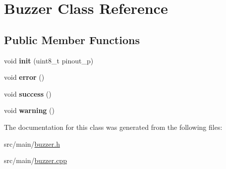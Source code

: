 \hypertarget{class_buzzer}{}\section{Buzzer Class Reference}
\label{class_buzzer}
\subsection*{Public Member Functions}
\begin{DoxyCompactItemize}
\item 
\mbox{\label{class_buzzer_ae5530b62a199e66e1c4c95dfd14bab3b}} 
void {\bfseries init} (uint8\+\_\+t pinout\+\_\+p)
\item 
\mbox{\label{class_buzzer_a84c33234bf71806d631e1a939d649438}} 
void {\bfseries error} ()
\item 
\mbox{\label{class_buzzer_a9d9c6ae9bd4993d9b34a96c5ae60b5ed}} 
void {\bfseries success} ()
\item 
\mbox{\label{class_buzzer_a90e969d3ca0c6300d7639bf650cf0f79}} 
void {\bfseries warning} ()
\end{DoxyCompactItemize}


The documentation for this class was generated from the following files\+:\begin{DoxyCompactItemize}
\item 
src/main/\hyperlink{buzzer_8h}{buzzer.\+h}\item 
src/main/\hyperlink{buzzer_8cpp}{buzzer.\+cpp}\end{DoxyCompactItemize}
